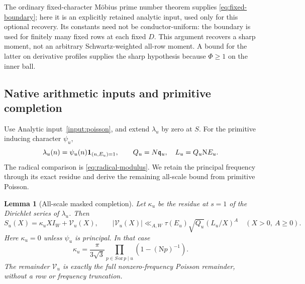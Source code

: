 \documentclass[11pt]{article}
\numberwithin{equation}{section}
\newtheorem{lemma}[theorem]{Lemma}
\theoremstyle{definition}
\theoremstyle{remark}
\newcommand{\N}{\mathrm N}
\newcommand{\ind}{\mathbf 1}
\begin{document}
The ordinary fixed-character M\"obius prime number theorem supplies
\eqref{eq:fixed-boundary}; here it is an explicitly retained analytic
input, used only for this optional recovery. Its constants need not
be conductor-uniform: the boundary is used for finitely many fixed
rows at each fixed \(D\). This argument recovers a sharp moment,
not an arbitrary Schwartz-weighted all-row moment.
A bound for the latter on derivative profiles supplies the sharp
hypothesis because \(\Phi\ge1\) on the inner ball.

\subsection{Native arithmetic inputs and primitive completion}

Use Analytic input~\ref{input:poisson}, and extend \(\lambda_u\)
by zero at \(S\). For the primitive inducing character \(\psi_u\),
\begin{equation}\label{sfac:eq:primitive-presentation}
 \lambda_u(n)=\psi_u(n)\ind_{(n,E_u)=1},\qquad
 Q_u=\\N\mathfrak q_u,\quad L_u=Q_u\N E_u.
\end{equation}
The radical comparison is \eqref{eq:radical-modulus}.
We retain the principal frequency through its exact residue and derive
the remaining all-scale bound from primitive Poisson.

\begin{lemma}[All-scale masked completion]
\label{sfac:lem:completion}
Let $\kappa_u$ be the residue at $s=1$ of the Dirichlet series of
$\lambda_u$.  Then
\begin{equation}
 S_u(X)=\kappa_u XI_W+\mathcal V_u(X),\qquad
 |\mathcal V_u(X)|\ll_{A,W}
      \tau(E_u)\sqrt{Q_u}(L_u/X)^A
      \quad(X>0,\ A\ge0).
 \label{sfac:eq:completion}
\end{equation}
Here $\kappa_u=0$ unless $\psi_u$ is principal.  In that case
\begin{equation}
 \kappa_u=\frac{\pi}{3\sqrt3}
       \prod_{p\in S\,\text{or}\,p\mid u}(1-(\N p)^{-1}).
 \label{sfac:eq:residue}
\end{equation}
The remainder $\mathcal V_u$ is exactly the full nonzero-frequency
Poisson remainder, without a row or frequency truncation.
\end{lemma}
\end{document}
